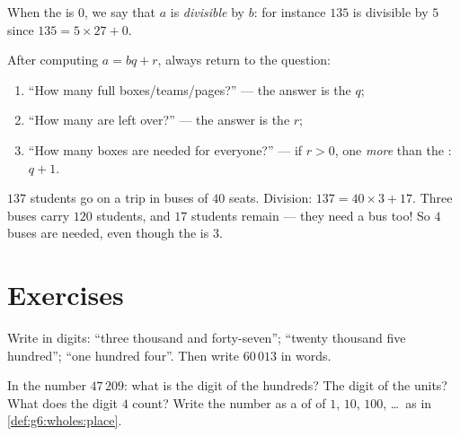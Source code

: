 \begin{definition}[Divisible]\label{def:g6:wholes:divisible}
When the  is $0$, we say that $a$ is
\emph{divisible} by $b$: for instance $135$ is
divisible by $5$ since $135 = 5 \times 27 + 0$.
\end{definition}

\begin{method}\label{met:g6:wholes:problems}
After computing $a = bq + r$, always return to the question:
\begin{enumerate}
  \item ``How many full boxes/teams/pages?'' --- the answer is the
         $q$;
  \item ``How many are left over?'' --- the answer is the 
        $r$;
  \item ``How many boxes are needed for everyone?'' --- if $r > 0$, one
        \emph{more} than the : $q + 1$.
\end{enumerate}
\end{method}

\begin{example}\label{ex:g6:wholes:bus}
$137$ students go on a trip in buses of $40$ seats. Division:
$137 = 40 \times 3 + 17$. Three buses carry $120$ students, and $17$
students remain --- they need a bus too! So $4$ buses are needed, even
though the  is $3$.
\end{example}

\section{Exercises}

\begin{exercise}[$\star$]\label{exo:g6:wholes:1}
Write in digits: ``three thousand and forty-seven''; ``twenty thousand
five hundred''; ``one hundred four''. Then write $60\,013$ in words.
\end{exercise}

\begin{exercise}[$\star$]\label{exo:g6:wholes:2}
In the number $47\,209$: what is the digit of the hundreds? The digit of
the units? What does the digit $4$ count? Write the number as a  of
 of $1$, $10$, $100$, \dots\ as in
\cref{def:g6:wholes:place}.
\end{exercise}

